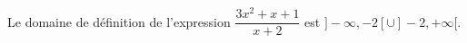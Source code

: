 Le domaine de définition de l'expression $\dfrac{3x^2+x+1}{x+2}$ est $]-\infty,-2[\cup ]-2,+\infty[$.

\begin{reponses}
\end{reponses}

